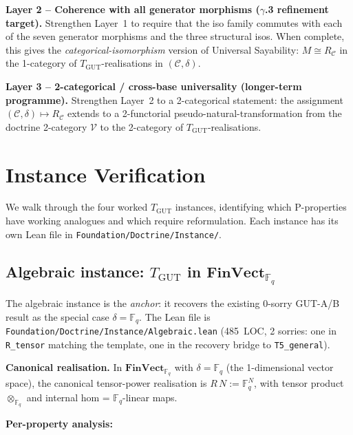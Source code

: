 \documentclass[11pt,a4paper]{article}
\theoremstyle{plain}
\theoremstyle{definition}
\theoremstyle{remark}
\newcommand{\F}{\mathbb{F}}
\newcommand{\cat}[1]{\mathbf{#1}}
\newcommand{\FinVect}{\cat{FinVect}}
\newcommand{\TGUT}{T_{\mathrm{GUT}}}
\begin{document}
\textbf{Layer 2 -- Coherence with all generator morphisms ($\gamma$.3 refinement target).} Strengthen Layer~1 to require that the iso family commutes with each of the seven generator morphisms and the three structural isos. When complete, this gives the \emph{categorical-isomorphism} version of Universal Sayability: $M \cong R_{\mathcal{C}}$ in the 1-category of $\TGUT$-realisations in $(\mathcal{C}, \delta)$.

\textbf{Layer 3 -- 2-categorical / cross-base universality (longer-term programme).} Strengthen Layer~2 to a 2-categorical statement: the assignment $(\mathcal{C}, \delta) \mapsto R_{\mathcal{C}}$ extends to a 2-functorial pseudo-natural-transformation from the doctrine 2-category $\mathcal{V}$ to the 2-category of $\TGUT$-realisations.

\section{Instance Verification}\label{sec:instances}

We walk through the four worked $\TGUT$ instances, identifying which P-properties have working analogues and which require reformulation. Each instance has its own Lean file in \texttt{Foundation/Doctrine/Instance/}.

\subsection{Algebraic instance: $\TGUT$ in $\FinVect_{\F_q}$}\label{sec:inst:alg}

The algebraic instance is the \emph{anchor}: it recovers the existing 0-sorry GUT-A/B result as the special case $\delta = \F_q$. The Lean file is \texttt{Foundation/Doctrine/Instance/Algebraic.lean} (485~LOC, 2 sorries: one in \texttt{R\_tensor} matching the template, one in the recovery bridge to \texttt{T5\_general}).

\textbf{Canonical realisation.} In $\FinVect_{\F_q}$ with $\delta = \F_q$ (the 1-dimensional vector space), the canonical tensor-power realisation is $R\,N := \F_q^N$, with tensor product $\otimes_{\F_q}$ and internal hom = $\F_q$-linear maps.

\textbf{Per-property analysis:}
\end{document}
